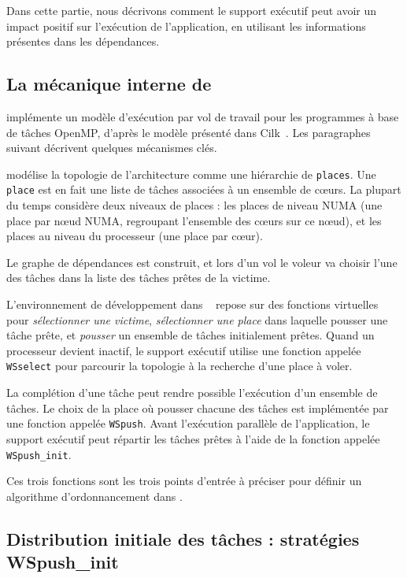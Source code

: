 \documentclass[parallelisme]{compas2016}
\begin{document}
Dans cette partie, nous décrivons comment le support exécutif peut avoir un impact
positif sur l'exécution de l'application, en utilisant les informations présentes
dans les dépendances.


\vspace*{-1ex}
\subsection{La mécanique interne de \kaapi}

\kaapi implémente un modèle d'exécution par vol de travail pour les programmes
à base de tâches OpenMP, d'après le modèle présenté dans Cilk~\cite{cilk5}.
Les paragraphes suivant décrivent quelques mécanismes clés.


\kaapi modélise la topologie de l'architecture comme une hiérarchie de \verb/places/.
Une \verb/place/ est en fait une liste de tâches associées à un ensemble de cœurs.
La plupart du temps \kaapi considère deux niveaux de places : les places de niveau
NUMA (une place par nœud NUMA, regroupant l'ensemble des cœurs sur ce nœud),
et les places au niveau du processeur (une place par cœur).


Le graphe de dépendances est construit, et lors d'un vol le voleur va choisir
l'une des tâches dans la liste des tâches prêtes de la victime.

L'environnement de développement dans \kaapi~\cite{DBLP:journals/corr/BleuseGLMT14} repose sur des fonctions
virtuelles pour \textit{sélectionner une victime}, \textit{sélectionner une place} dans
laquelle pousser une tâche prête, et \textit{pousser} un ensemble de tâches initialement
prêtes.
Quand un processeur devient inactif, le support exécutif utilise une fonction appelée
\verb/WSselect/ pour parcourir la topologie à la recherche d'une place à voler.

La complétion d'une tâche peut rendre possible l'exécution d'un ensemble de tâches.
Le choix de la place où pousser chacune des tâches est implémentée par une fonction
appelée \verb/WSpush/.
Avant l'exécution parallèle de l'application, le support exécutif peut répartir
les tâches prêtes à l'aide de la fonction appelée \verb/WSpush_init/.

Ces trois fonctions sont les trois points d'entrée à préciser pour définir
un algorithme d'ordonnancement dans \kaapi.



\vspace*{-1ex}
\subsection{Distribution initiale des tâches : stratégies WSpush\_init}
\end{document}
